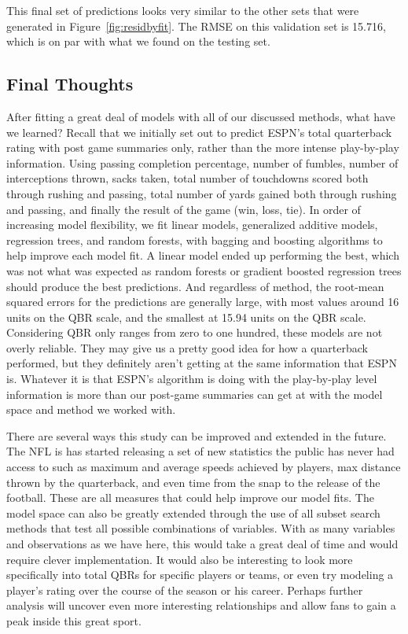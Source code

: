 \documentclass[12pt]{article}\usepackage[]{graphicx}\usepackage[]{color}
\begin{document}
This final set of predictions looks very similar to the other sets that were generated in Figure~\ref{fig:residbyfit}. The RMSE on this validation set is 15.716, which is on par with what we found on the testing set.

\subsection{Final Thoughts}
After fitting a great deal of models with all of our discussed methods, what have we learned? Recall that we initially set out to predict ESPN's total quarterback rating with post game summaries only, rather than the more intense play-by-play information. Using passing completion percentage, number of fumbles, number of interceptions thrown, sacks taken, total number of touchdowns scored both through rushing and passing, total number of yards gained both through rushing and passing, and finally the result of the game (win, loss, tie). In order of increasing model flexibility, we fit linear models, generalized additive models, regression trees, and random forests, with bagging and boosting algorithms to help improve each model fit. A linear model ended up performing the best, which was not what was expected as random forests or gradient boosted regression trees should produce the best predictions. And regardless of method, the root-mean squared errors for the predictions are generally large, with most values around 16 units on the QBR scale, and the smallest at 15.94 units on the QBR scale. Considering QBR only ranges from zero to one hundred, these models are not overly reliable. They may give us a pretty good idea for how a quarterback performed, but they definitely aren't getting at the same information that ESPN is. Whatever it is that ESPN's algorithm is doing with the play-by-play level information is more than our post-game summaries can get at with the model space and method we worked with. 

There are several ways this study can be improved and extended in the future. The NFL is has started releasing a set of new statistics the public has never had access to such as maximum and average speeds achieved by players, max distance thrown by the quarterback, and even time from the snap to the release of the football. These are all measures that could help improve our model fits. The model space can also be greatly extended through the use of all subset search methods that test all possible combinations of variables. With as many variables and observations as we have here, this would take a great deal of time and would require clever implementation. It would also be interesting to look more specifically into total QBRs for specific players or teams, or even try modeling a player's rating over the course of the season or his career. Perhaps further analysis will uncover even more interesting relationships and allow fans to gain a peak inside this great sport.
\end{document}
